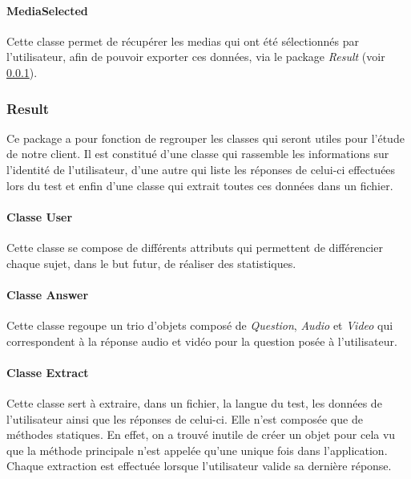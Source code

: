 \paragraph{MediaSelected}

Cette classe permet de récupérer les medias qui ont été sélectionnés par l'utilisateur, afin de pouvoir exporter ces données, via le package \textit{Result} (voir \ref{Archi_Results}).


\subsubsection{Result}\label{Archi_Results}

Ce package a pour fonction de regrouper les classes qui seront utiles pour l'étude de notre client. Il est constitué d'une classe qui rassemble les informations sur l'identité de l'utilisateur, d'une autre qui liste les réponses de celui-ci effectuées lors du test et enfin d'une classe qui extrait toutes ces données dans un fichier.

\paragraph{Classe User}

Cette classe se compose de différents attributs qui permettent de différencier chaque sujet, dans le but futur, de réaliser des statistiques.

\paragraph{Classe Answer}

Cette classe regoupe un trio d'objets composé de \textit{Question}, \textit{Audio} et \textit{Video} qui correspondent à la réponse audio et vidéo pour la question posée à l'utilisateur.

\paragraph{Classe Extract}

Cette classe sert à extraire, dans un fichier, la langue du test, les données de l'utilisateur ainsi que les réponses de celui-ci. Elle n'est composée que de méthodes statiques. En effet, on a trouvé inutile de créer un objet pour cela vu que la méthode principale n'est appelée qu'une unique fois dans l'application. Chaque extraction est effectuée lorsque l'utilisateur valide sa dernière réponse.



